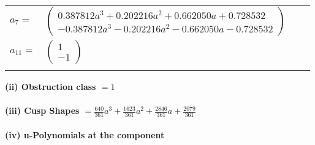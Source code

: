 \documentclass[1p]{elsarticle_modified}
\theoremstyle{definition}
\begin{document}
\begin{tabular}{m{7pt} m{180pt} m{7pt} m{180pt} }
\flushright $a_{7}=$&$\begin{pmatrix}0.387812 a^{3}+0.202216 a^{2}+0.662050 a+0.728532\\-0.387812 a^{3}-0.202216 a^{2}-0.662050 a-0.728532\end{pmatrix}$ \\
\flushright $a_{11}=$&$\begin{pmatrix}1\\-1\end{pmatrix}$\\&\end{tabular}
\flushleft \textbf{(ii) Obstruction class $= 1$}\\~\\
\flushleft \textbf{(iii) Cusp Shapes $= \frac{640}{361} a^3+\frac{1623}{361} a^2+\frac{2846}{361} a+\frac{2079}{361}$}\\~\\
\newpage\renewcommand{\arraystretch}{1}
\flushleft \textbf{(iv) u-Polynomials at the component}\newline \\
\end{document}
